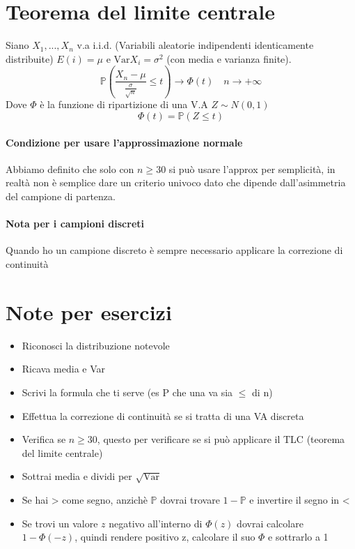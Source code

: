 \section{Teorema del limite centrale}
Siano $X_1, ..., X_n$ v.a i.i.d. (Variabili aleatorie indipendenti identicamente distribuite)
$E(i) = \mu$ e $\text{Var}X_i = \sigma^2$ (con media e varianza finite).
\begin{equation*}
    \mathbb{P} (\frac{X_n-\mu}{\frac{\sigma}{\sqrt{n}}} \leq t) \rightarrow \Phi (t) \quad n \rightarrow + \infty   
\end{equation*}
Dove $\Phi$ è la funzione di ripartizione di una V.A $Z\sim N(0,1)$
\begin{equation*}
    \Phi(t) = \mathbb{P}(Z \leq t)
\end{equation*}
\paragraph*{Condizione per usare l'approssimazione normale} Abbiamo definito 
che solo con $n \geq 30$ si può usare l'approx per semplicità, in realtà non è semplice
dare un criterio univoco dato che dipende dall'asimmetria del campione di partenza.
\paragraph*{Nota per i campioni discreti} Quando ho un campione discreto è sempre necessario
applicare la correzione di continuità 

\section*{Note per esercizi}
\begin{itemize}
    \item Riconosci la distribuzione notevole
    \item Ricava media e Var
    \item Scrivi la formula che ti serve (es P che una va sia $\leq$ di n)
    \item Effettua la correzione di continuità se si tratta di una VA discreta
    \item Verifica se $n\geq 30$, questo per verificare se si può applicare il TLC (teorema del limite centrale)
    \item Sottrai media e dividi per $\sqrt{\text{Var}}$
    \item Se hai > come segno, anzichè $\mathbb{P}$ dovrai trovare $1-\mathbb{P}$ e invertire il segno in <
    \item Se trovi un valore $z$ negativo all'interno di $\Phi(z)$ dovrai calcolare $1 - \Phi(-z)$, quindi rendere positivo
    z, calcolare il suo $\Phi$ e sottrarlo a 1
\end{itemize}
